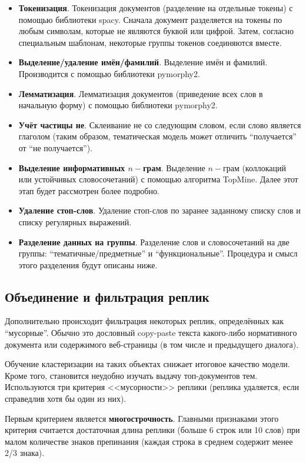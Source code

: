 \begin{itemize}
\item \textbf{Токенизация}. Токенизация документов (разделение на отдельные токены) с помощью библиотеки spacy. Сначала документ разделяется на токены по любым символам, которые не являются буквой или цифрой. Затем, согласно специальным шаблонам, некоторые группы токенов соединяются вместе.
\item \textbf{Выделение/удаление имён/фамилий}. Выделение имён и фамилий. Производится с помощью библиотеки pymorphy2.
\item \textbf{Лемматизация}. Лемматизация документов (приведение всех слов в начальную форму) с помощью библиотеки pymorphy2.
\item \textbf{Учёт частицы не}. Склеивание не со следующим словом, если слово является глаголом (таким образом, тематическая модель может отличить ``получается'' от ``не получается'').
\item \textbf{Выделение информативных $n-$грам}. Выделение $n-$грам (коллокаций или устойчивых словосочетаний) с помощью алгоритма TopMine. Далее этот этап будет рассмотрен более подробно.
\item \textbf{Удаление стоп-слов}. Удаление стоп-слов по заранее заданному списку слов и списку регулярных выражений.
\item \textbf{Разделение данных на группы}. Разделение слов и словосочетаний на две группы: “тематичные/предметные” и “функциональные”. Процедура и смысл этого разделения будут описаны ниже.
\end{itemize}

\subsection{Объединение и фильтрация реплик}

Дополнительно происходит фильтрация некоторых реплик, определённых как “мусорные”. Обычно это дословный copy-paste текста какого-либо нормативного документа или содержимого веб-страницы (в том числе и предыдущего диалога).

Обучение кластеризации на таких объектах снижает итоговое качество модели. Кроме того, становится неудобно изучать выдачу топ-документов тем. Используются три критерия <<мусорности>> реплики (реплика удаляется, если справедлив хотя бы один из них).

Первым критерием является \textbf{многострочность}. Главными признаками этого критерия считается достаточная длина реплики (больше 6 строк или 10 слов) при малом количестве знаков препинания (каждая строка в среднем содержит менее 2/3 знака).


